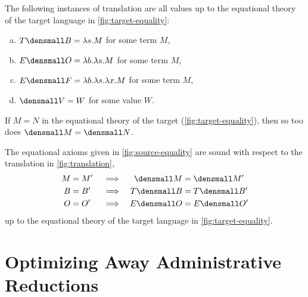 \documentclass[runningheads]{llncs}
\begin{document}
\begin{lemma}
  The following instances of translation are all values up to the equational
  theory of the target language in \cref{fig:target-equality}:
  \begin{enumerate}[(a)]
  \item $T\den{B} = \lambda s. M$ for some term $M$,
  \item $E\den{O} = \lambda b. \lambda s. M$ for some term $M$,
  \item $E\den{F} = \lambda b. \lambda s. \lambda x. M$ for some term $M$,
  \item $\den{V} = W$ for some value $W$.
  \end{enumerate}
\end{lemma}

\begin{proposition}
  If $M = N$ in the equational theory of the target
  (\cref{fig:target-equality}), then so too does $\den{M} = \den{N}$.
\end{proposition}

\begin{proposition}[Soundness]
  The equational axioms given in \cref{fig:source-equality} are sound with
  respect to the translation in \cref{fig:translation},
  \begin{align*}
    M &= M' &&\implies & \den{M} &= \den{M'} \\
    B &= B' &&\implies & T\den{B} &= T\den{B'} \\
    O &= O' &&\implies & E\den{O} &= E\den{O'}
  \end{align*}
  up to the equational theory of the target language in
  \cref{fig:target-equality}.
\end{proposition}

\section{Optimizing Away Administrative Reductions}
\end{document}
